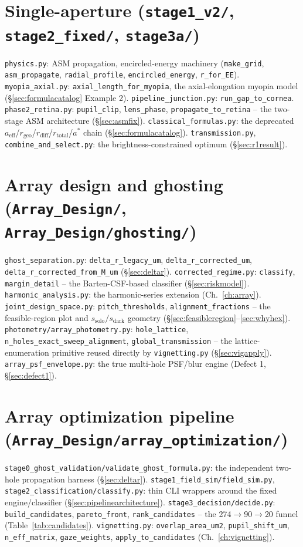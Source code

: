 \documentclass[11pt]{report}
\newcommand{\aeff}{a_{\text{eff}}}
\newcommand{\rgeo}{r_{\text{geo}}}
\newcommand{\rdiff}{r_{\text{diff}}}
\newcommand{\rtotal}{r_{\text{total}}}
\begin{document}
\section*{Single-aperture (\texttt{stage1\_v2/}, \texttt{stage2\_fixed/}, \texttt{stage3a/})}
\texttt{physics.py}: ASM propagation, encircled-energy machinery
(\texttt{make\_grid}, \texttt{asm\_propagate}, \texttt{radial\_profile},
\texttt{encircled\_energy}, \texttt{r\_for\_EE}). \texttt{myopia\_axial.py}:
\texttt{axial\_length\_for\_myopia}, the axial-elongation myopia model
(\S\ref{sec:formulacatalog} Example 2). \texttt{pipeline\_junction.py}: \texttt{run\_gap\_to\_cornea}.
\texttt{phase2\_retina.py}: \texttt{pupil\_clip}, \texttt{lens\_phase},
\texttt{propagate\_to\_retina} -- the two-stage ASM architecture (\S\ref{sec:asmfix}).
\texttt{classical\_formulas.py}: the deprecated $\aeff$/$\rgeo$/$\rdiff$/$\rtotal$/$a^*$ chain
(\S\ref{sec:formulacatalog}). \texttt{transmission.py}, \texttt{combine\_and\_select.py}: the
brightness-constrained optimum (\S\ref{sec:r1result}).

\section*{Array design and ghosting (\texttt{Array\_Design/}, \texttt{Array\_Design/ghosting/})}
\texttt{ghost\_separation.py}: \texttt{delta\_r\_legacy\_um}, \texttt{delta\_r\_corrected\_um},
\texttt{delta\_r\_corrected\_from\_M\_um} (\S\ref{sec:deltar}). \texttt{corrected\_regime.py}:
\texttt{classify}, \texttt{margin\_detail} -- the Barten-CSF-based classifier
(\S\ref{sec:riskmodel}). \texttt{harmonic\_analysis.py}: the harmonic-series extension
(Ch.~\ref{ch:array}). \texttt{joint\_design\_space.py}: \texttt{pitch\_thresholds},
\texttt{alignment\_fractions} -- the feasible-region plot and $s_{\text{solo}}/s_{\text{dark}}$
geometry (\S\ref{sec:feasibleregion}--\ref{sec:whyhex}). \texttt{photometry/array\_photometry.py}:
\texttt{hole\_lattice}, \texttt{n\_holes\_exact\_sweep\_alignment},
\texttt{global\_transmission} -- the lattice-enumeration primitive reused directly by
\texttt{vignetting.py} (\S\ref{sec:vigapply}). \texttt{array\_psf\_envelope.py}: the true
multi-hole PSF/blur engine (Defect 1, \S\ref{sec:defect1}).

\section*{Array optimization pipeline (\texttt{Array\_Design/array\_optimization/})}
\texttt{stage0\_ghost\_validation/validate\_ghost\_formula.py}: the independent two-hole
propagation harness (\S\ref{sec:deltar}). \texttt{stage1\_field\_sim/field\_sim.py},
\texttt{stage2\_classification/classify.py}: thin CLI wrappers around the fixed engine/classifier
(\S\ref{sec:pipelinearchitecture}). \texttt{stage3\_decision/decide.py}: \texttt{build\_candidates},
\texttt{pareto\_front}, \texttt{rank\_candidates} -- the 274$\to$90$\to$20 funnel
(Table~\ref{tab:candidates}). \texttt{vignetting.py}: \texttt{overlap\_area\_um2},
\texttt{pupil\_shift\_um}, \texttt{n\_eff\_matrix}, \texttt{gaze\_weights},
\texttt{apply\_to\_candidates} (Ch.~\ref{ch:vignetting}).
\end{document}
